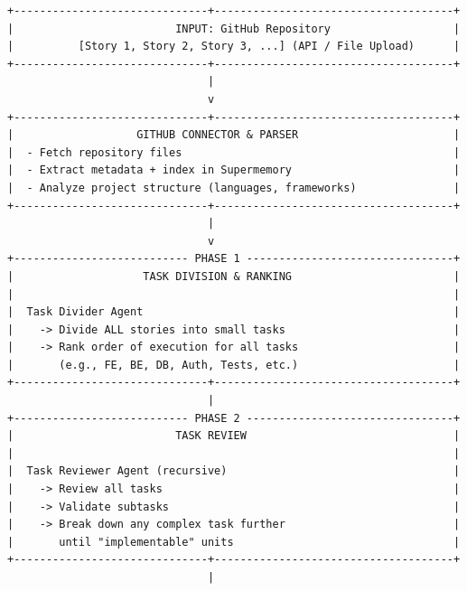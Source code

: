 \documentclass[11pt,a4paper]{article}
\begin{document}
\vspace*{-0.2cm}
\lstset{
  basicstyle=\small\ttfamily,
  breaklines=true,
  breakatwhitespace=false,
  breakindent=0pt,
  columns=fullflexible,
  keepspaces=true
}
\begin{center}
\begin{lstlisting}
+------------------------------+-------------------------------------+
|                         INPUT: GitHub Repository                   |
|          [Story 1, Story 2, Story 3, ...] (API / File Upload)      |
+------------------------------+-------------------------------------+
                               |
                               v
+------------------------------+-------------------------------------+
|                   GITHUB CONNECTOR & PARSER                        |
|  - Fetch repository files                                          |
|  - Extract metadata + index in Supermemory                         |
|  - Analyze project structure (languages, frameworks)               |
+------------------------------+-------------------------------------+
                               |
                               v
+--------------------------- PHASE 1 --------------------------------+
|                    TASK DIVISION & RANKING                         |
|                                                                    |
|  Task Divider Agent                                                |
|    -> Divide ALL stories into small tasks                          |
|    -> Rank order of execution for all tasks                        |
|       (e.g., FE, BE, DB, Auth, Tests, etc.)                        |
+------------------------------+-------------------------------------+
                               |
+--------------------------- PHASE 2 --------------------------------+
|                         TASK REVIEW                                |
|                                                                    |
|  Task Reviewer Agent (recursive)                                   |
|    -> Review all tasks                                             |
|    -> Validate subtasks                                            |
|    -> Break down any complex task further                          |
|       until "implementable" units                                  |
+------------------------------+-------------------------------------+
                               |


\end{lstlisting}
\end{center}
\end{document}
